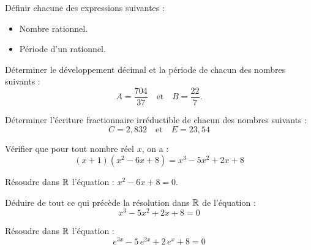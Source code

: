 \documentclass[11pt]{article}
\begin{document}

\begin{questions}
  \item Définir chacune des expressions suivantes :
  \begin{itemize}
    \item Nombre rationnel.
    \item Période d'un rationnel.
  \end{itemize}
  \item Déterminer le développement décimal et la période de chacun des nombres suivants :
  \[ A = \frac{704}{37} \quad \text{et} \quad B = \frac{22}{7}. \]
  \item Déterminer l'écriture fractionnaire irréductible de chacun des nombres suivants :
  \[ C = 2{,}832 \quad \text{et} \quad E = 23{,}54 \]
\end{questions}

\begin{questions}
  \item Vérifier que pour tout nombre réel $x$, on a :
  \[ (x + 1)(x^2 - 6x + 8) = x^3 - 5x^2 + 2x + 8 \]
  \item \begin{sousq}
    \item Résoudre dans $\mathbb{R}$ l'équation : $x^2 - 6x + 8 = 0$.
    \item Déduire de tout ce qui précède la résolution dans $\mathbb{R}$ de l'équation :
    \[ x^3 - 5x^2 + 2x + 8 = 0 \]
  \end{sousq}
  \item Résoudre dans $\mathbb{R}$ l'équation :
  \[ e^{3x} - 5\,e^{2x} + 2\,e^{x} + 8 = 0 \]
\end{questions}
\end{document}

